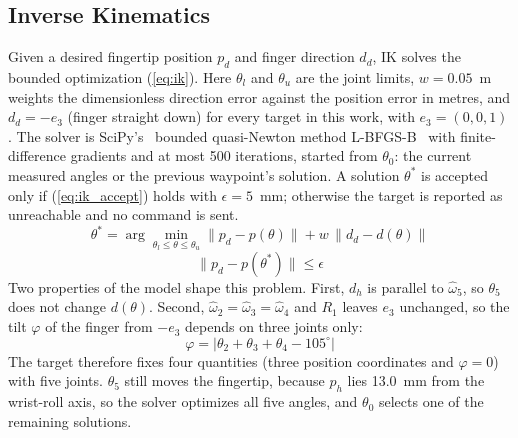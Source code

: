\documentclass[letterpaper, 10 pt, conference]{ieeeconf}
\begin{document}
\subsection{Inverse Kinematics}
\label{sec:ik}
Given a desired fingertip position $p_d$ and finger direction $d_d$, IK solves the bounded optimization
(\ref{eq:ik}). Here $\theta_l$ and $\theta_u$ are the joint limits, $w = 0.05$~m weights the dimensionless
direction error against the position error in metres, and $d_d = -e_3$ (finger straight down) for every
target in this work, with $e_3 = (0, 0, 1)$. The solver is SciPy's~\cite{c5} bounded quasi-Newton method
L-BFGS-B~\cite{c6} with finite-difference gradients and at most 500 iterations, started from $\theta_0$:
the current measured angles or the previous waypoint's solution. A solution $\theta^{*}$ is accepted only if
(\ref{eq:ik_accept}) holds with $\epsilon = 5$~mm; otherwise the target is reported as unreachable and no
command is sent.
\begin{equation}
\theta^{*} = \arg\min_{\theta_l \le \theta \le \theta_u}
\lVert p_d - p(\theta) \rVert + w\,\lVert d_d - d(\theta) \rVert
\label{eq:ik}
\end{equation}
\begin{equation}
\lVert p_d - p(\theta^{*}) \rVert \le \epsilon
\label{eq:ik_accept}
\end{equation}
Two properties of the model shape this problem. First, $d_h$ is parallel to $\hat{\omega}_5$, so
$\theta_5$ does not change $d(\theta)$. Second, $\hat{\omega}_2 = \hat{\omega}_3 = \hat{\omega}_4$ and
$R_1$ leaves $e_3$ unchanged, so the tilt $\varphi$ of the finger from $-e_3$ depends on three joints only:
\begin{equation}
\varphi = \left| \theta_2 + \theta_3 + \theta_4 - 105^\circ \right|
\label{eq:tilt}
\end{equation}
The target therefore fixes four quantities (three position coordinates and $\varphi = 0$) with five joints.
$\theta_5$ still moves the fingertip, because $p_h$ lies 13.0~mm from the wrist-roll axis, so the solver
optimizes all five angles, and $\theta_0$ selects one of the remaining solutions.
\end{document}
